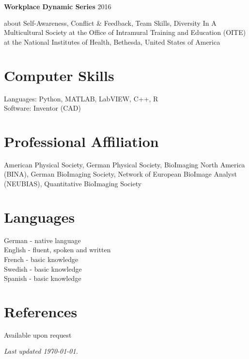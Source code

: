 \documentclass[margin,line]{res}
\begin{document}
\begin{resume}
{\bf Workplace Dynamic Series} \hfill {2016}\\
\vspace*{-3.5mm}
\begin{addmargin}[0pt]{.1\linewidth}
\vspace*{-1mm}
about Self-Awareness, Conflict \& Feedback, Team Skills, Diversity In A Multicultural Society at the Office of Intramural Training and Education (OITE) at the National Institutes of Health, Bethesda, United States of America
\end{addmargin}


\section{\sc Computer Skills} 

Languages:  Python, MATLAB, LabVIEW, C++, R\\ %
Software: Inventor (CAD)%


\section{\sc Professional Affiliation} 
American Physical Society, German Physical Society, BioImaging North America (BINA), German BioImaging Society, Network of European BioImage Analyst (NEUBIAS), Quantitative BioImaging Society


\section{\sc Languages} 
German - native language\\English  - fluent, spoken and written  \\French - basic knowledge \\Swedish - basic knowledge \\Spanish - basic knowledge


\section{\sc References} 
Available upon request

\vfill
 \hfill \emph{Last updated {\today}.}

\end{resume}
\end{document}
